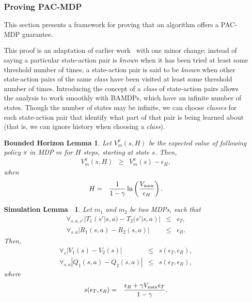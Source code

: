 \subsubsection{Proving PAC-MDP}


\newcommand{\A}{$\mathbf{A}$\ }
\newcommand{\As}{$\mathbf{A}$'s\ }

This section presents a framework for proving that an algorithm offers a PAC-MDP guarantee.

This proof is an adaptation of earlier work~\cite{lihong09pacmdp,kearns02} with one minor change: instead of saying a particular state-action pair is \emph{known} when it has been tried at least some threshold number of times, a state-action pair is said to be \emph{known} when other state-action pairs of the same \emph{class} have been visited at least some threshold number of times. Introducing the concept of a \emph{class} of state-action pairs allows the analysis to work smoothly with BAMDPs, which have an infinite number of states. Though the number of states may be infinite, we can choose \emph{classes} for each state-action pair that identify what part of that pair is being learned about (that is, we can ignore history when choosing a \emph{class}).

\newtheorem*{horizonlemma}{Bounded Horizon Lemma}
\begin{horizonlemma}

\label{sec:pacmdp:horizon-error}
Let $V^\pi_m(s,H)$ be the expected value of following policy $\pi$ in MDP $m$ for $H$ steps, starting at state $s$. Then,
\begin{eqnarray}
V^\pi_m(s,H) &\geq& V^\pi_m(s) - \epsilon_H,
\end{eqnarray}
when
\begin{eqnarray}
H&=&\frac 1 {1-\gamma} \ln\left(\frac {V_{\rm max}} {\epsilon_H}\right).
\end{eqnarray}
\end{horizonlemma}

\newtheorem*{simlemma}{Simulation Lemma~\cite{lihong09simlemma,kearns02}}
\begin{simlemma}

\label{sec:pacmdp:simulation}
Let $m_1$ and $m_2$ be two MDPs, such that
\begin{eqnarray}
\forall_{s,a,s'} |T_1(s'|s,a) - T_2(s'|s,a)| &\leq& \epsilon_T,\\
\forall_{s,a} |R_1(s,a) - R_2(s,a)| &\leq& \epsilon_R.
\end{eqnarray}
Then,
\begin{eqnarray}
\forall_s |V_1(s) - V_2(s)| &\leq& s(\epsilon_T,\epsilon_R),\\
\forall_{s,a} |Q_1(s,a) - Q_2(s,a)| &\leq& s(\epsilon_T,\epsilon_R),
\end{eqnarray}
where
\begin{eqnarray}
s(\epsilon_T,\epsilon_R) &=& \frac {\epsilon_R + \gamma V_{\rm max} \epsilon_T} {1-\gamma}.
\end{eqnarray}
\end{simlemma}

